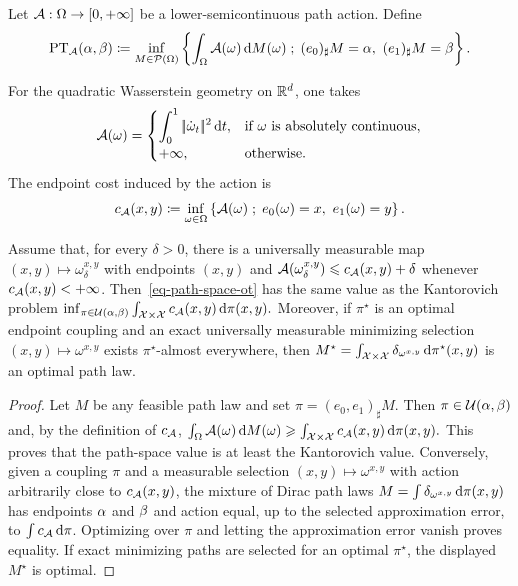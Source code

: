 \begin{defn}\label{def-path-space-transport}
Let $\mathcal{A}:\Omega\to[0,+\infty]$ be a lower-semicontinuous path action. Define
\begin{equation}\label{eq-path-space-ot}
\operatorname{PT}_{\mathcal{A}}(\alpha,\beta)
\coloneqq
\inf_{M\in\mathcal{P}(\Omega)}
\left\{ 
\int_\Omega \mathcal{A}(\omega)\,\mathrm{d} M(\omega)
 \;;\; 
(e_0)_\sharp M=\alpha,\ (e_1)_\sharp M=\beta
 \right\}.
\end{equation}
\end{defn}
For the quadratic Wasserstein geometry on $\mathbb{R}^d$, one takes
\[
\mathcal{A}(\omega)=
\begin{cases}
\displaystyle \int_0^1 |\!| \dot\omega_t |\!|^2\,\mathrm{d} t,
& \text{if }\omega\text{ is absolutely continuous},\\[.4em]
+\infty, & \text{otherwise}.
\end{cases}
\]
The endpoint cost induced by the action is
\begin{equation}\label{eq-path-action-endpoint-cost}
c_{\mathcal{A}}(x,y)
\coloneqq
\inf_{\omega\in\Omega}
\left\{ \mathcal{A}(\omega) \;;\; e_0(\omega)=x,\ e_1(\omega)=y \right\}.
\end{equation}
\begin{prop}\label{prop-path-space-ot-endpoint-reduction}
Assume that, for every $\delta>0$, there is a universally measurable map $(x,y)\mapsto\omega_\delta^{x,y}$ with endpoints $(x,y)$ and
$\mathcal{A}(\omega_\delta^{x,y})\leqslant c_{\mathcal{A}}(x,y)+\delta$ whenever $c_{\mathcal{A}}(x,y)<+\infty$. Then~\eqref{eq-path-space-ot} has the same value as the Kantorovich problem
\(\inf_{\pi\in\mathcal{U}(\alpha,\beta)} \int_{\mathcal{X}\times\mathcal{X}} c_{\mathcal{A}}(x,y)\,\mathrm{d}\pi(x,y).\)
Moreover, if $\pi^\star$ is an optimal endpoint coupling and an exact universally measurable minimizing selection $(x,y)\mapsto\omega^{x,y}$ exists $\pi^\star$-almost everywhere, then
\(M^\star = \int_{\mathcal{X}\times\mathcal{X}}\delta_{\omega^{x,y}}\,\mathrm{d}\pi^\star(x,y)\)
is an optimal path law.
\end{prop}
\begin{proof}
Let $M$ be any feasible path law and set $\pi=(e_0,e_1)_\sharp M$. Then $\pi\in\mathcal{U}(\alpha,\beta)$ and, by the definition of $c_{\mathcal{A}}$, \(\int_\Omega \mathcal{A}(\omega)\,\mathrm{d} M(\omega) \geqslant \int_{\mathcal{X}\times\mathcal{X}} c_{\mathcal{A}}(x,y)\,\mathrm{d}\pi(x,y).\)
This proves that the path-space value is at least the Kantorovich value. Conversely, given a coupling $\pi$ and a measurable selection $(x,y)\mapsto\omega^{x,y}$ with action arbitrarily close to $c_{\mathcal{A}}(x,y)$, the mixture of Dirac path laws
\(M=\int\delta_{\omega^{x,y}}\,\mathrm{d}\pi(x,y)\)
has endpoints $\alpha$ and $\beta$ and action equal, up to the selected approximation error, to $\int c_{\mathcal{A}}\,\mathrm{d}\pi$. Optimizing over $\pi$ and letting the approximation error vanish proves equality. If exact minimizing paths are selected for an optimal $\pi^\star$, the displayed $M^\star$ is optimal.
\end{proof}
